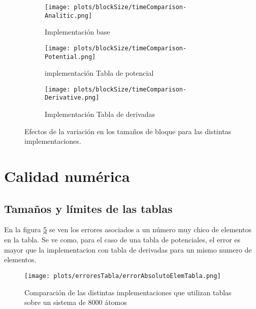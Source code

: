\begin{figure}[htbp]
\centering
\begin{subfigure}[b]{\plotwidthtres}
   \texttt{[image: plots/blockSize/timeComparison-Analitic.png]}
   \caption{Implementación base}
   \label{fig:cpu-scalability-caroteno}
 \end{subfigure}
\begin{subfigure}[b]{\plotwidthtres}
   \texttt{[image: plots/blockSize/timeComparison-Potential.png]}
   \caption{implementación Tabla de potencial}
   \label{fig:cpu-scalability-fullereno}
 \end{subfigure}
\begin{subfigure}[b]{\plotwidthtres}
   \texttt{[image: plots/blockSize/timeComparison-Derivative.png]}
   \caption{Implementación Tabla de derivadas}
   \label{fig:cpu-scalability-hemo}
 \end{subfigure}
 \caption{Efectos de la variación en los tamaños de bloque para las distintas implementaciones.}
 \label{blockSize}
\end{figure}










\section{Calidad numérica}

\subsection{Tamaños y límites de las tablas}
En la figura \ref{errorAbsElemTabla} se ven los errores asociados a un número muy chico de elementos en la tabla. 
Se ve como, para el caso de una tabla de potenciales, el error es mayor que la implementacion con tabla de derivadas
para un mismo numero de elementos.

\begin{figure}[htbp]
\centering
   \texttt{[image: plots/erroresTabla/errorAbsolutoElemTabla.png]}
 \caption{Comparaci\'on de las distintas implementaciones que utilizan tablas sobre un sistema de 8000 átomos }
 \label{errorAbsElemTabla}
\end{figure}





